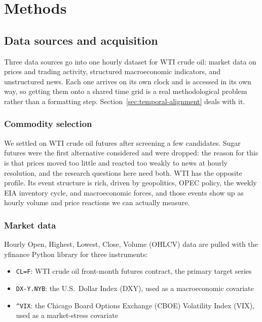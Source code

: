 \chapter{Methods}\label{chap:methods}

\section{Data sources and acquisition}\label{sec:data-sources}

Three data sources go into one hourly dataset for WTI crude oil: market data on prices and trading activity, structured macroeconomic indicators, and unstructured news. Each one arrives on its own clock and is accessed in its own way, so getting them onto a shared time grid is a real methodological problem rather than a formatting step. Section~\ref{sec:temporal-alignment} deals with it.

\subsection{Commodity selection}\label{sec:commodity-selection}

We settled on WTI crude oil futures after screening a few candidates. Sugar futures were the first alternative considered and were dropped: the reason for this is that prices moved too little and reacted too weakly to news at hourly resolution, and the research questions here need both. WTI has the opposite profile. Its event structure is rich, driven by geopolitics, OPEC policy, the weekly EIA inventory cycle, and macroeconomic forces, and those events show up as hourly volume and price reactions we can actually measure.

\subsection{Market data}\label{sec:market-data}

Hourly Open, Highest, Lowest, Close, Volume (OHLCV) data are pulled with the yfinance Python library \citep{yfinance} for three instruments:

\begin{itemize}
  \item \texttt{CL=F}: WTI crude oil front-month futures contract, the primary target series
  \item \texttt{DX-Y.NYB}: the U.S.\ Dollar Index (DXY), used as a macroeconomic covariate
  \item \texttt{\^{}VIX}: the Chicago Board Options Exchange (CBOE) Volatility Index (VIX), used as a market-stress covariate
\end{itemize}

